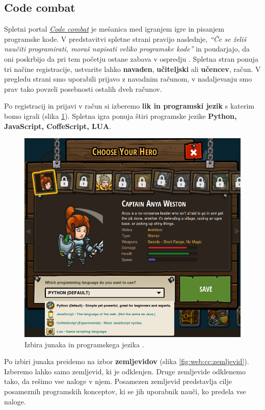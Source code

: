 \subsection{Code combat}
\label{sec:code_battle}

Spletni portal \emph{\href{https://codecombat.com/}{Code combat}}
\cite{web:codecombat} je mešanica med igranjem igre in pisanjem
programske kode. V predstavitvi spletne strani pravijo naslednje,
\emph{``Če se želiš naučiti programirati, moraš napisati veliko
  programske kode''} in poudarjajo, da oni poskrbijo da pri tem
početju ostane zabava v ospredju \cite{web:codecombat:about}. Spletna
stran ponuja tri načine registracije, ustvarite lahko
\textbf{navaden}, \textbf{učiteljski} ali \textbf{učencev}, račun. V
pregledu strani smo uporabili prijavo z navadnim računom, v
nadaljevanju smo prav tako povzeli posebnosti ostalih dveh računov.

Po registracij in prijavi v račun si izberemo \textbf{lik in
  programski jezik} s katerim bomo igrali (slika
\ref{fig:web:cc:hero}). Spletna igra ponuja štiri programske jezike
\textbf{Python, JavaScript, CoffeScript, LUA}. 

\begin{figure}[h!]
  \centering
    \includegraphics [width=0.45\linewidth, keepaspectratio =
   1] {./images/sc_web/cc_hero-lang-v01.jpg}
   \caption{Izbira junaka in programskega jezika \cite{web:codecombat}.}
   \label{fig:web:cc:hero}
 \end{figure}


 Po izbiri junaka preidemo na izbor \textbf{zemljevidov} (slika
 \ref{fig:web:cc:zemljevid}). Izberemo lahko samo zemljevid, ki je
 odklenjen. Druge zemljevide odklenemo tako, da rešimo vse naloge v
 njem. Posamezen zemljevid predstavlja cilje posameznih programskih
 konceptov, ki se jih uporabnik nauči, ko predela vse naloge.

